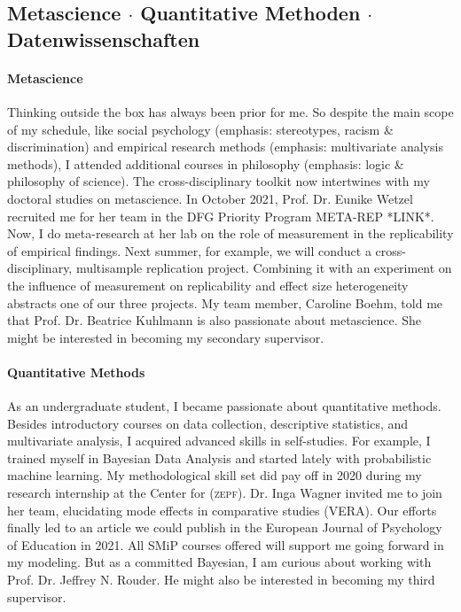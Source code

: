 \documentclass[10pt]{FreemanML}
\begin{document}
\subsection{Metascience $\cdot$ Quantitative Methoden $\cdot$ Datenwissenschaften}

\paragraph{Metascience}

Thinking outside the box has always been prior for me. So despite the main
scope of my schedule, like social psychology (emphasis: stereotypes, racism &
discrimination) and empirical research methods (emphasis: multivariate analysis
methods), I attended additional courses in philosophy (emphasis: logic \&
philosophy of science). The cross-disciplinary toolkit now intertwines with my
doctoral studies on metascience. In October 2021, Prof. Dr. Eunike Wetzel
recruited me for her team in the DFG Priority Program META-REP *LINK*. Now, I
do meta-research at her lab on the role of measurement in the replicability of
empirical findings. Next summer, for example, we will conduct a
cross-disciplinary, multisample replication project. Combining it with an
experiment on the influence of measurement on replicability and effect size
heterogeneity abstracts one of our three projects. My team member, Caroline
Boehm, told me that Prof. Dr. Beatrice Kuhlmann is also passionate about
metascience. She might be interested in becoming my secondary supervisor.

\paragraph{Quantitative Methods}

As an undergraduate student, I became passionate about quantitative methods.
Besides introductory courses on data collection, descriptive statistics, and
multivariate analysis, I acquired advanced skills in self-studies. For example,
I trained myself in Bayesian Data Analysis and started lately with
probabilistic machine learning. My methodological skill set did pay off in 2020
during my research internship at the Center for (\textsc{zepf}). Dr. Inga
Wagner invited me to join her team, elucidating mode effects in comparative
studies (VERA). Our efforts finally led to an article we could publish in the
European Journal of Psychology of Education in 2021. All SMiP courses offered
will support me going forward in my modeling. But as a committed Bayesian, I am
curious about working with Prof. Dr. Jeffrey N. Rouder. He might also be
interested in becoming my third supervisor.
\end{document}

